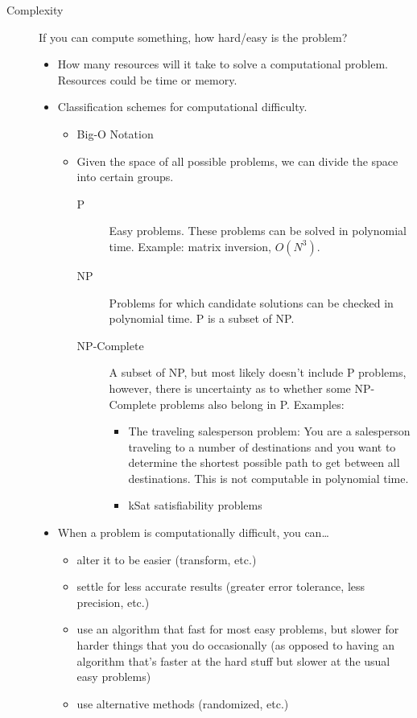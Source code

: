 \documentclass{article}
\begin{document}
\begin{description}
    \item [Complexity] If you can compute something, how hard/easy is the problem?
    \begin{itemize}
        \item How many resources will it take to solve a computational problem. Resources could be time or memory.
        \item Classification schemes for computational difficulty.
        \begin{itemize}
            \item Big-O Notation
            \item Given the space of all possible problems, we can divide the space into certain groups.
            \begin{description}
                \item [P] Easy problems. These problems can be solved in polynomial time. Example: matrix inversion, $O(N^3)$.
                \item [NP] Problems for which candidate solutions can be checked in polynomial time. P is a subset of NP.
                \item [NP-Complete] A subset of NP, but most likely doesn't include P problems, however, there is uncertainty as to whether some NP-Complete problems also belong in P. Examples:
                \begin{itemize}
                    \item  The traveling salesperson problem: You are a salesperson traveling to a number of destinations and you want to determine the shortest possible path to get between all destinations. This is not computable in polynomial time.
                    \item kSat satisfiability problems
                \end{itemize}
            \end{description}
        \end{itemize}
        \item When a problem is computationally difficult, you can\dots
        \begin{itemize}
            \item alter it to be easier (transform, etc.)
            \item settle for less accurate results (greater error tolerance, less precision, etc.)
            \item use an algorithm that fast for most easy problems, but slower for harder things that you do occasionally (as opposed to having an algorithm that's faster at the hard stuff but slower at the usual easy problems)
            \item use alternative methods (randomized, etc.)
        \end{itemize}
    \end{itemize}
\end{description}
\end{document}
